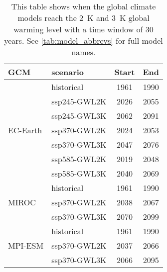\begin{table}[!htbp]
\centering
\caption{This table shows when the global climate models reach the \qty{2}{\kelvin} and \qty{3}{\kelvin} global warming level with a time window of 30 years. See \autoref{tab:model_abbrevs} for full model names.}
\label{Table:GWL}
\begin{tabular}{|l|l|c|c|}
\toprule
GCM & scenario & Start & End \\
\midrule
\multirow{7}{*}{EC-Earth} & historical & 1961 & 1990\\
 &  ssp245-GWL2K & 2026 & 2055\\
 &  ssp245-GWL3K & 2062 & 2091\\
 &  ssp370-GWL2K & 2024 & 2053\\
 &  ssp370-GWL3K & 2047 & 2076\\
 &  ssp585-GWL2K & 2019 & 2048\\
 &  ssp585-GWL3K & 2040 & 2069\\
\cmidrule(lr){1-4}
\multirow{3}{*}{MIROC} & historical & 1961 & 1990\\
 &  ssp370-GWL2K & 2038 & 2067\\
 &  ssp370-GWL3K & 2070 & 2099\\
\cmidrule(lr){1-4}
\multirow{3}{*}{MPI-ESM} & historical & 1961 & 1990\\
 &  ssp370-GWL2K & 2037 & 2066\\
 &  ssp370-GWL3K & 2066 & 2095\\
\bottomrule
\end{tabular}
\end{table}

